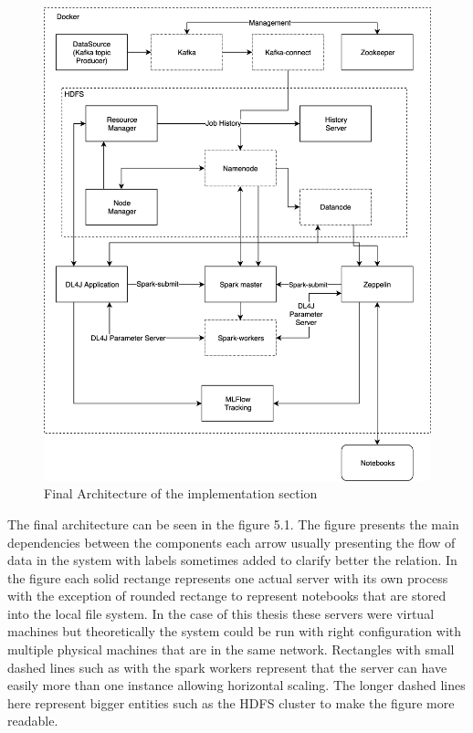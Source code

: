 \begin{figure}[ht!]
    \includegraphics[scale=0.20]{images/architecture} 
    \centering
    \caption{Final Architecture of the implementation section}
\end{figure}

The final architecture can be seen in the figure 5.1.
The figure presents the main dependencies between the components each arrow usually presenting the flow of data in the system with labels sometimes added to clarify better the relation.
In the figure each solid rectange represents one actual server with its own process with the exception of rounded rectange to represent notebooks that are stored into the local file system.
In the case of this thesis these servers were virtual machines but theoretically the system could be run with right configuration with multiple physical machines that are in the same network.
Rectangles with small dashed lines such as with the spark workers represent that the server can have easily more than one instance allowing horizontal scaling.
The longer dashed lines here represent bigger entities such as the HDFS cluster to make the figure more readable.

